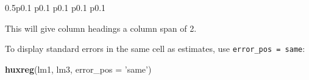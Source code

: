 \documentclass[]{article}
\newenvironment{Shaded}{\begin{snugshade}}{\end{snugshade}}
\newcommand{\DataTypeTok}[1]{\textcolor[rgb]{0.13,0.29,0.53}{#1}}
\newcommand{\KeywordTok}[1]{\textcolor[rgb]{0.13,0.29,0.53}{\textbf{#1}}}
\newcommand{\NormalTok}[1]{#1}
\newcommand{\StringTok}[1]{\textcolor[rgb]{0.31,0.60,0.02}{#1}}
\begin{document}
\begin{table}[h]
\begin{threeparttable}
\begin{tabularx}{0.5\textwidth}{p{} p{} p{} p{} p{}}
 \tabularnewline[-0.5pt]


\hhline{}
\end{tabularx}\end{threeparttable}


\end{table}
 

\FloatBarrier

This will give column headings a column span of 2.

To display standard errors in the same cell as estimates, use
\texttt{error\_pos\ =\ \textquotesingle{}same\textquotesingle{}}:

\begin{Shaded}
\begin{Highlighting}[]
\KeywordTok{huxreg}\NormalTok{(lm1, lm3, }\DataTypeTok{error_pos =} \StringTok{'same'}\NormalTok{)}
\end{Highlighting}
\end{Shaded}

 
  \providecommand{\huxb}[2]{\arrayrulecolor[RGB]{#1}\global\arrayrulewidth=#2pt}
  \providecommand{\huxvb}[2]{\color[RGB]{#1}\vrule width #2pt}
  \providecommand{\huxtpad}[1]{\rule{0pt}{\baselineskip+#1}}
  \providecommand{\huxbpad}[1]{\rule[-#1]{0pt}{#1}}
\end{document}
